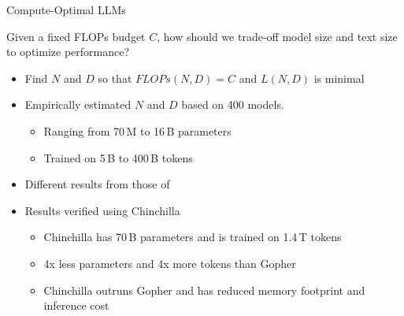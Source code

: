 \begin{vbframe}{Compute-Optimal LLM\MakeLowercase{s}}

Given a fixed FLOPs budget $C$, how should we trade-off model size and text size to optimize performance? 

\vfill

\begin{itemize}

	\item Find $N$ and $D$ so that $FLOPs(N,D) = C$ and $L(N,D)$ is minimal

	\item Empirically estimated $N$ and $D$ based on 400 models. 
	\begin{itemize}
	\item Ranging from 70\,M to 16\,B parameters
	\item Trained on 5\,B to 400\,B tokens
	\end{itemize}

	\item Different results from those of  
	\item Results verified using Chinchilla
	\begin{itemize}
	\item Chinchilla has 70\,B parameters and is trained on 1.4\,T tokens
	\item 4x less parameters and 4x more tokens than Gopher
	\item Chinchilla outruns Gopher and has reduced memory footprint and inference cost 
	\end{itemize}

\end{itemize}

\vfill

\end{vbframe}


